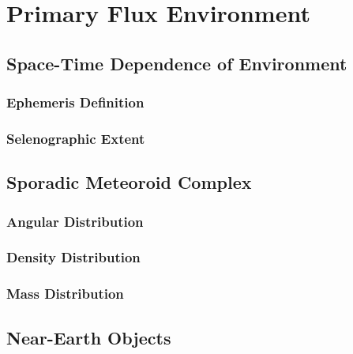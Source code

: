 \documentclass{article}
\begin{document}
\section{Primary Flux Environment}



\subsection{Space-Time Dependence of Environment}


\subsubsection{Ephemeris Definition}


\subsubsection{Selenographic Extent}


\subsection{Sporadic Meteoroid Complex}

\subsubsection{Angular Distribution}


\subsubsection{Density Distribution}


\subsubsection{Mass Distribution}

	
\subsection{Near-Earth Objects}
\end{document}
